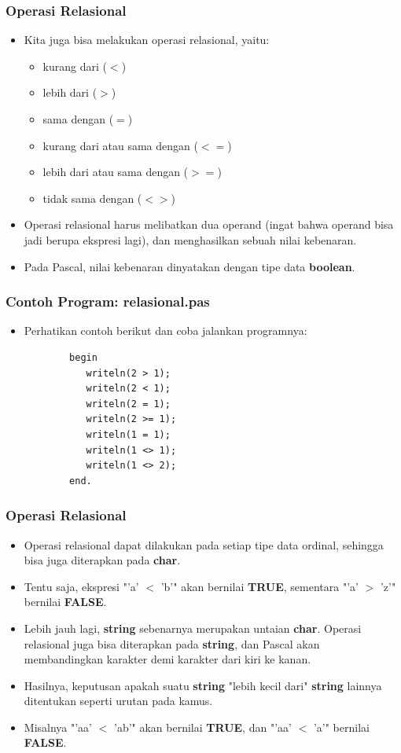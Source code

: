 \documentclass{beamer}
\begin{document}
\begin{frame}
\frametitle{Operasi Relasional}
\begin{itemize}
	\item Kita juga bisa melakukan operasi relasional, yaitu:
	\begin{itemize}
		\item kurang dari ($<$)
		\item lebih dari ($>$)
		\item sama dengan ($=$)
		\item kurang dari atau sama dengan ($<=$)
		\item lebih dari atau sama dengan ($>=$)
		\item tidak sama dengan ($<>$)
	\end{itemize}
	\item Operasi relasional harus melibatkan dua operand (ingat bahwa operand bisa jadi berupa ekspresi lagi), dan menghasilkan sebuah nilai kebenaran. \item Pada Pascal, nilai kebenaran dinyatakan dengan tipe data \alert{\textbf{boolean}}.
\end{itemize}
\end{frame}

\begin{frame}[fragile]
\frametitle{Contoh Program: relasional.pas}
\begin{itemize}
	\item Perhatikan contoh berikut dan coba jalankan programnya:
	\begin{lstlisting}
		begin
		   writeln(2 > 1);
		   writeln(2 < 1);
		   writeln(2 = 1);
		   writeln(2 >= 1);
		   writeln(1 = 1);
		   writeln(1 <> 1);
		   writeln(1 <> 2);
		end.
	\end{lstlisting}
\end{itemize}
\end{frame}

\begin{frame}
\frametitle{Operasi Relasional}
\begin{itemize}
	\item Operasi relasional dapat dilakukan pada setiap tipe data ordinal, sehingga bisa juga diterapkan pada \textbf{char}.
	\item Tentu saja, ekspresi "'a' $<$ 'b'" akan bernilai \textbf{TRUE}, sementara "'a' $>$ 'z'" bernilai \textbf{FALSE}.
	\item Lebih jauh lagi, \textbf{string} sebenarnya merupakan untaian \textbf{char}. Operasi relasional juga bisa diterapkan pada \textbf{string}, dan Pascal akan membandingkan karakter demi karakter dari kiri ke kanan. 
	\item Hasilnya, keputusan apakah suatu \textbf{string} "lebih kecil dari" \textbf{string} lainnya ditentukan seperti urutan pada kamus.
	\item Misalnya "'aa' $<$ 'ab'" akan bernilai \textbf{TRUE}, dan "'aa' $<$ 'a'" bernilai \textbf{FALSE}. 
\end{itemize}
\end{frame}
\end{document}
